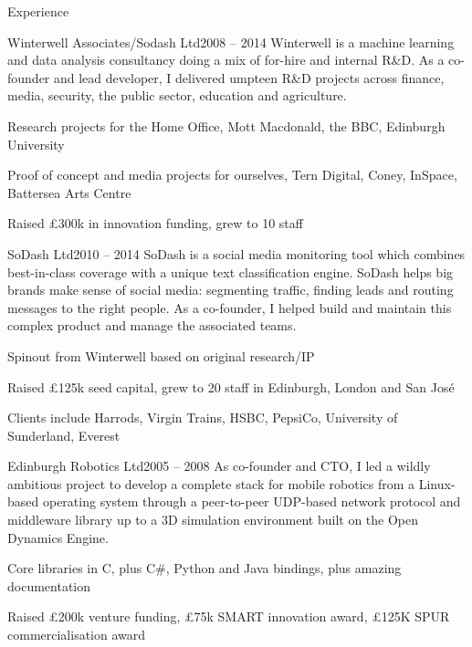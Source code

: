 \documentclass{resume} %
\begin{document}
\begin{rSection}{Experience}

\begin{rSubsection}{Winterwell Associates/Sodash Ltd}{2008 -- 2014}
{Winterwell is a machine learning and data analysis consultancy doing a mix of for-hire and internal R\&D. As a co-founder and lead developer, I delivered umpteen R\&D projects across finance, media, security, the public sector, education and agriculture.}{}
\item Research projects for the Home Office, Mott Macdonald, the BBC, Edinburgh University
\item Proof of concept and media projects for ourselves, Tern Digital, Coney, InSpace, Battersea Arts Centre
\item Raised £300k in innovation funding, grew to 10 staff
\end{rSubsection}


\begin{rSubsection}{SoDash Ltd}{2010 -- 2014}
{SoDash is a social media monitoring tool which combines best-in-class coverage
with a unique text classification engine. SoDash helps big brands make sense of
social media: segmenting traffic, finding leads and routing messages to the right people.
As a co-founder, I helped build and maintain this complex product and manage the associated teams.}{}
\item Spinout from Winterwell based on original research/IP
\item Raised £125k seed capital, grew to 20 staff in Edinburgh, London and San José
\item Clients include Harrods, Virgin Trains, HSBC, PepsiCo, University of Sunderland, Everest
\end{rSubsection}


\begin{rSubsection}{Edinburgh Robotics Ltd}{2005 -- 2008}
{As co-founder and CTO, I led a wildly ambitious project to develop a complete stack for mobile robotics from a Linux-based operating system through a peer-to-peer UDP-based network protocol and middleware library up to a 3D simulation environment built on the Open Dynamics Engine.}{}
\item Core libraries in C, plus C\#, Python and Java bindings, plus amazing documentation
\item Raised £200k venture funding, £75k SMART innovation award, £125K SPUR commercialisation award
\end{rSubsection}


\end{rSection}
\end{document}
